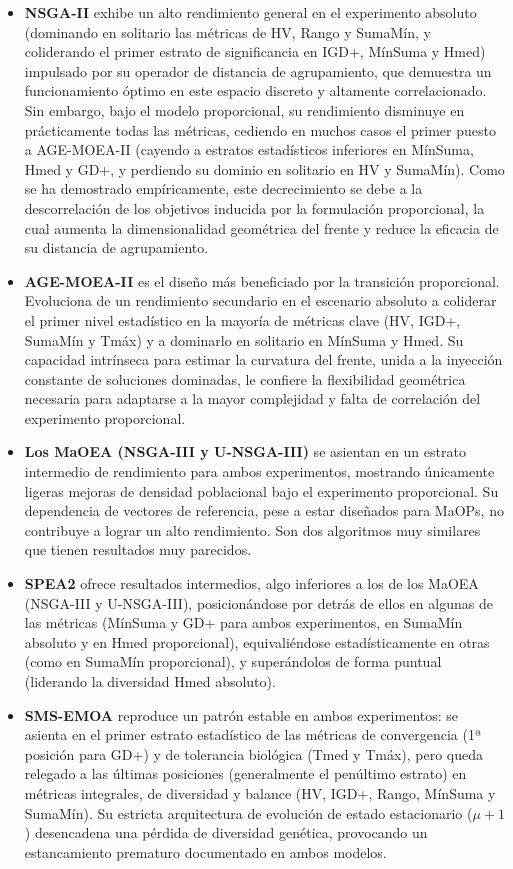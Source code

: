 \begin{itemize}
    \item \textbf{NSGA-II} exhibe un alto rendimiento general en el experimento absoluto (dominando en solitario las métricas de HV, Rango y SumaMín, y coliderando el primer estrato de significancia en IGD+, MínSuma y Hmed) impulsado por su operador de distancia de agrupamiento, que demuestra un funcionamiento óptimo en este espacio discreto y altamente correlacionado. Sin embargo, bajo el modelo proporcional, su rendimiento disminuye en prácticamente todas las métricas, cediendo en muchos casos el primer puesto a AGE-MOEA-II (cayendo a estratos estadísticos inferiores en MínSuma, Hmed y GD+, y perdiendo su dominio en solitario en HV y SumaMín). Como se ha demostrado empíricamente, este decrecimiento se debe a la descorrelación de los objetivos inducida por la formulación proporcional, la cual aumenta la dimensionalidad geométrica del frente y reduce la eficacia de su distancia de agrupamiento.
    \item \textbf{AGE-MOEA-II} es el diseño más beneficiado por la transición proporcional. Evoluciona de un rendimiento secundario en el escenario absoluto a coliderar el primer nivel estadístico en la mayoría de métricas clave (HV, IGD+, SumaMín y Tmáx) y a dominarlo en solitario en MínSuma y Hmed. Su capacidad intrínseca para estimar la curvatura del frente, unida a la inyección constante de soluciones dominadas, le confiere la flexibilidad geométrica necesaria para adaptarse a la mayor complejidad y falta de correlación del experimento proporcional.
    \item \textbf{Los MaOEA (NSGA-III y U-NSGA-III)} se asientan en un estrato intermedio de rendimiento para ambos experimentos, mostrando únicamente ligeras mejoras de densidad poblacional bajo el experimento proporcional. Su dependencia de vectores de referencia, pese a estar diseñados para MaOPs, no contribuye a lograr un alto rendimiento. Son dos algoritmos muy similares que tienen resultados muy parecidos.
    \item \textbf{SPEA2} ofrece resultados intermedios, algo inferiores a los de los MaOEA (NSGA-III y U-NSGA-III), posicionándose por detrás de ellos en algunas de las métricas (MínSuma y GD+ para ambos experimentos, en SumaMín absoluto y en Hmed proporcional), equivaliéndose estadísticamente en otras (como en SumaMín proporcional), y superándolos de forma puntual (liderando la diversidad Hmed absoluto).
    \item \textbf{SMS-EMOA} reproduce un patrón estable en ambos experimentos: se asienta en el primer estrato estadístico de las métricas de convergencia (1ª posición para GD+) y de tolerancia biológica (Tmed y Tmáx), pero queda relegado a las últimas posiciones (generalmente el penúltimo estrato) en métricas integrales, de diversidad y balance (HV, IGD+, Rango, MínSuma y SumaMín). Su estricta arquitectura de evolución de estado estacionario ($\mu+1$) desencadena una pérdida de diversidad genética, provocando un estancamiento prematuro documentado en ambos modelos.

\end{itemize}
